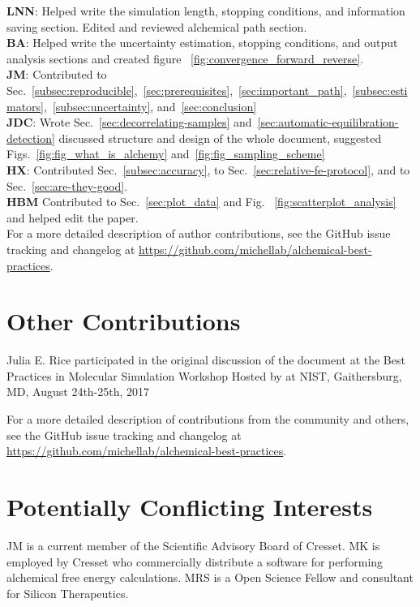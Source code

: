 \documentclass[9pt,bestpractices]{livecoms}
\newcommand{\githubrepository}{\url{https://github.com/michellab/alchemical-best-practices}} %
\begin{document}
\textbf{LNN}: Helped write the simulation length, stopping conditions, and information saving section. Edited and reviewed alchemical path section.\\
\textbf{BA}: Helped write the uncertainty estimation, stopping conditions, and output analysis sections and created figure ~\ref{fig:convergence_forward_reverse}.\\
\textbf{JM}: Contributed to Sec.~\ref{subsec:reproducible},~\ref{sec:prerequisites},~\ref{sec:important_path},~\ref{subsec:estimators},~\ref{subsec:uncertainty}, and~\ref{sec:conclusion}\\
\textbf{JDC}: Wrote Sec.~\ref{sec:decorrelating-samples} and~\ref{sec:automatic-equilibration-detection} discussed structure and design of the whole document, suggested Figs.~\ref{fig:fig_what_is_alchemy} and~\ref{fig:fig_sampling_scheme} \\
\textbf{HX}: Contributed Sec.~\ref{subsec:accuracy}, to Sec.~\ref{sec:relative-fe-protocol}, and to Sec.~\ref{sec:are-they-good}.\\
\textbf{HBM} Contributed to Sec.~\ref{sec:plot_data} and Fig.~ \ref{fig:scatterplot_analysis} and helped edit the paper.\\
For a more detailed description of author contributions,
see the GitHub issue tracking and changelog at \githubrepository.

\section*{Other Contributions}
%
Julia E. Rice participated in the original discussion of the document at the Best Practices in Molecular Simulation Workshop Hosted by at NIST, Gaithersburg, MD, August 24th-25th, 2017

For a more detailed description of contributions from the community and others, 
see the GitHub issue tracking and changelog at \githubrepository.


\section*{Potentially Conflicting Interests}
JM is a current member of the Scientific Advisory Board of Cresset. 
MK is employed by Cresset who commercially distribute a software for performing alchemical free energy calculations. MRS is a Open Science Fellow and consultant for Silicon Therapeutics.
\end{document}
